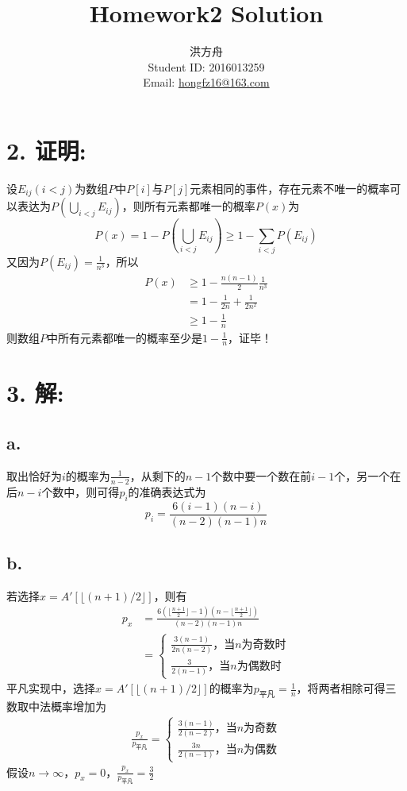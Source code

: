 \documentclass[12pt]{article}
\title{Homework2 Solution}
\author{洪方舟\\Student ID: 2016013259\\Email: \href{mailto:hongfz16@163.com}{hongfz16@163.com}}
\begin{document}
  \maketitle
  \section*{2. \textbf{证明:}}
  	设$E_{ij}(i<j)$为数组$P$中$P[i]$与$P[j]$元素相同的事件，存在元素不唯一的概率可以表达为$P\left(\bigcup\limits_{i<j} E_{ij}\right)$，则所有元素都唯一的概率$P(x)$为
  	\begin{equation*}
  	  P(x)=1-P\left(\bigcup\limits_{i<j} E_{ij}\right) \geq 1-\sum_{i<j} P(E_{ij})
  	\end{equation*}
  	又因为$P(E_{ij})=\frac{1}{n^3}$，所以
  	\begin{align*}
  	  P(x) &\geq 1 - \frac{n(n-1)}{2}\frac{1}{n^3}\\
  	  &=1-\frac{1}{2n}+\frac{1}{2n^2}\\
  	  &\geq 1 - \frac{1}{n}
  	\end{align*}
  	则数组$P$中所有元素都唯一的概率至少是$1-\frac{1}{n}$，证毕！
  \section*{3. \textbf{解:}}
    \subsection*{a.}
      取出恰好为$i$的概率为$\frac{1}{n-2}$，从剩下的$n-1$个数中要一个数在前$i-1$个，另一个在后$n-i$个数中，则可得$p_i$的准确表达式为
      \begin{equation*}
        p_i=\frac{6(i-1)(n-i)}{(n-2)(n-1)n}
      \end{equation*}
    \subsection*{b.}
      若选择$x=A'[\lfloor (n+1)/2 \rfloor]$，则有
      \begin{align*}
        p_x &= \frac{6\left( \lfloor \frac{n+1}{2} \rfloor -1 \right)(n-\lfloor \frac{n+1}{2} \rfloor)}{(n-2)(n-1)n}\\
        &=\left\{
        \begin{aligned}
          \frac{3(n-1)}{2n(n-2)}，当n为奇数时\\
          \frac{3}{2(n-1)}，当n为偶数时
        \end{aligned}
        \right.
      \end{align*}
      平凡实现中，选择$x=A'[\lfloor (n+1)/2 \rfloor]$的概率为$p_{平凡}=\frac{1}{n}$，将两者相除可得三数取中法概率增加为
      \begin{align*}
        \frac{p_x}{p_{平凡}}=\left\{
        \begin{aligned}
          \frac{3(n-1)}{2(n-2)}，当n为奇数\\
          \frac{3n}{2(n-1)}，当n为偶数
        \end{aligned}
        \right.
      \end{align*}
      假设$n \rightarrow \infty$，$p_x=0$，$\frac{p_x}{p_{平凡}}=\frac{3}{2}$
\end{document}
